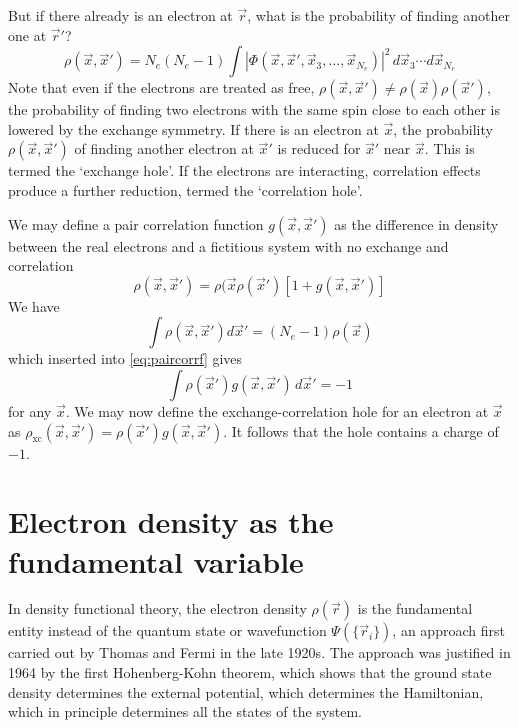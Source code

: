\documentclass[11pt,bibliography=totoc,index=totoc]{scrbook}   %
\begin{document}
But if there already is an electron at $\vec{r}$, what is the probability of finding another one at $\vec{r}'$? 
\begin{equation}
  \rho(\vec{x},\vec{x}') = N_e(N_e-1)\int |\Phi(\vec{x},\vec{x}',\vec{x}_3,\ldots,\vec{x}_{N_e} )|^2
 \,d\vec{x}_3\cdots d\vec{x}_{N_e}
\end{equation}
Note that even if the electrons are treated as free, $\rho(\vec{x},\vec{x}')\neq\rho(\vec{x})\rho(\vec{x}')$, the probability of finding two electrons with the same spin close to each other is lowered by the exchange symmetry. If there is an electron at $\vec{x}$, the probability $\rho(\vec{x},\vec{x}')$ of finding another electron at $\vec{x}'$ is reduced for $\vec{x}'$ near $\vec{x}$. 
This is termed the `exchange hole'.
If the electrons are interacting, correlation effects produce a further reduction, termed the `correlation hole'.

We may define a pair correlation function $g(\vec{x},\vec{x}')$ as the difference in density between the real electrons and a fictitious system with no exchange and correlation
\begin{equation}
  \rho(\vec{x},\vec{x}') = \rho(\vec{x}\rho(\vec{x}')[1 + g(\vec{x},\vec{x}')]
  \label{eq:paircorrf}
\end{equation}
We have
\begin{equation}
  \int \rho(\vec{x},\vec{x}') d\vec{x}' = (N_e-1)\rho(\vec{x})
\end{equation}
which inserted into \eqref{eq:paircorrf} gives
\begin{equation}
  \int \rho(\vec{x}') g(\vec{x},\vec{x}')\, d\vec{x}' = -1
\end{equation}
for any $\vec{x}$. We may now define the exchange-correlation hole for an electron at $\vec{x}$ as $\rho_{\text{xc}}(\vec{x},\vec{x}') = \rho(\vec{x}')g(\vec{x},\vec{x}')$. It follows that the hole contains a charge of $-1$.


\section{Electron density as the fundamental variable}

In density functional theory, the electron density $\rho(\vec{r})$ is the
fundamental entity instead of the quantum state or wavefunction
$\Psi(\{\vec{r}_i\})$, an
approach first carried out by Thomas\cite{Thomas:1927} and 
Fermi\cite{Fermi:1928} in the late 1920s. The approach was
justified in 1964 by the first Hohenberg-Kohn theorem\cite{HohenbergKohn:1964}, 
which shows that the ground state density determines the external potential,
which determines the Hamiltonian, which in principle determines all the 
states of the system.
\end{document}
